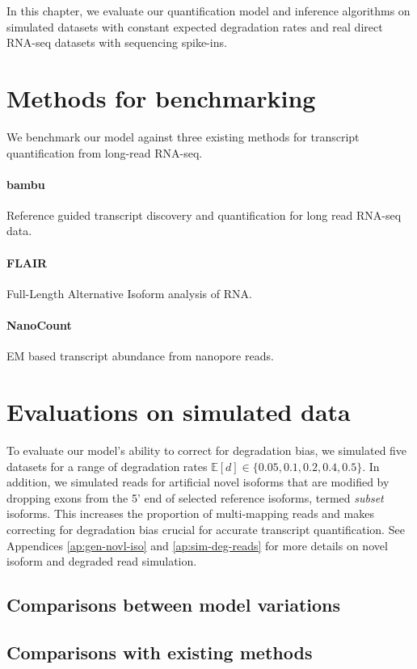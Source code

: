 
In this chapter, we evaluate our quantification model and inference algorithms on simulated datasets with constant expected degradation rates and real direct RNA-seq datasets with sequencing spike-ins. 

\section{Methods for benchmarking}

We benchmark our model against three existing methods for transcript quantification from long-read RNA-seq. 

\paragraph{bambu} Reference guided transcript discovery and quantification for long read RNA-seq data.
\paragraph{FLAIR} Full-Length Alternative Isoform analysis of RNA.
\paragraph{NanoCount} EM based transcript abundance from nanopore reads.

\section{Evaluations on simulated data}

To evaluate our model's ability to correct for degradation bias, we simulated five datasets for a range of degradation rates $\mathbb{E}[d]\in\{0.05,0.1,0.2,0.4,0.5\}$. In addition, we simulated reads for artificial novel isoforms that are modified by dropping exons from the 5' end of selected reference isoforms, termed \textit{subset} isoforms. This increases the proportion of multi-mapping reads and makes correcting for degradation bias crucial for accurate transcript quantification. See Appendices \ref{ap:gen-novl-iso} and \ref{ap:sim-deg-reads} for more details on novel isoform and degraded read simulation. 

\subsection{Comparisons between model variations}

\subsection{Comparisons with existing methods}

